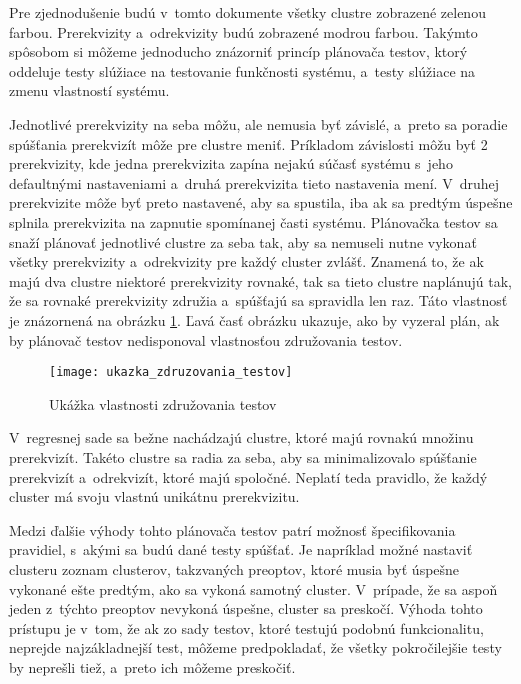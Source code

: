 Pre zjednodušenie budú v~tomto dokumente všetky clustre zobrazené zelenou farbou.
Prerekvizity a~odrekvizity budú zobrazené modrou farbou. Takýmto spôsobom
si môžeme jednoducho znázorniť princíp plánovača testov, ktorý oddeluje testy
slúžiace na testovanie funkčnosti systému, a~testy slúžiace na zmenu vlastností systému.

Jednotlivé prerekvizity na seba môžu, ale nemusia byť závislé, a~preto 
sa poradie spúšťania prerekvizít môže pre clustre meniť.
Príkladom závislosti môžu byť 2 prerekvizity, kde jedna prerekvizita 
zapína nejakú súčasť systému s~jeho defaultnými nastaveniami 
a~druhá prerekvizita tieto nastavenia mení. 
V~druhej prerekvizite môže byť preto nastavené, aby sa spustila, iba ak 
sa predtým úspešne splnila prerekvizita na zapnutie spomínanej časti 
systému. Plánovačka testov sa snaží plánovať jednotlivé clustre za seba 
tak, aby sa nemuseli nutne vykonať všetky prerekvizity a~odrekvizity pre 
každý cluster zvlášť. Znamená to, že ak majú dva clustre niektoré 
prerekvizity rovnaké, tak sa tieto clustre naplánujú tak, že sa rovnaké 
prerekvizity združia a~spúšťajú sa spravidla len raz. 
Táto vlastnosť je znázornená na obrázku \ref{obrazok:ukazka_zdruzovania_testov}. 
Ľavá časť obrázku ukazuje, ako by vyzeral plán, ak by plánovač testov
nedisponoval vlastnosťou združovania testov.

\begin{figure}[h]
  \begin{center}
    \texttt{[image: ukazka\_zdruzovania\_testov]}
    \caption{Ukážka vlastnosti združovania testov}
    \label{obrazok:ukazka_zdruzovania_testov}
  \end{center}
\end{figure}

V~regresnej sade sa bežne nachádzajú clustre, ktoré majú rovnakú množinu 
prerekvizít. Takéto clustre sa radia za seba, aby sa minimalizovalo
spúšťanie prerekvizít a~odrekvizít, ktoré majú spoločné. Neplatí teda 
pravidlo, že každý cluster má svoju vlastnú unikátnu prerekvizitu.



Medzi ďalšie výhody tohto plánovača testov patrí možnosť špecifikovania 
pravidiel, s~akými sa budú dané testy spúšťať. Je napríklad možné 
nastaviť clusteru zoznam clusterov, takzvaných preoptov, ktoré musia byť 
úspešne vykonané ešte predtým, ako sa vykoná samotný cluster. V~prípade, 
že sa aspoň jeden z~týchto preoptov nevykoná úspešne, cluster sa preskočí.
Výhoda tohto prístupu je v~tom, že ak zo sady testov, ktoré testujú 
podobnú funkcionalitu, neprejde najzákladnejší test, môžeme predpokladať, 
že všetky pokročilejšie testy by neprešli tiež, a~preto ich môžeme preskočiť.

